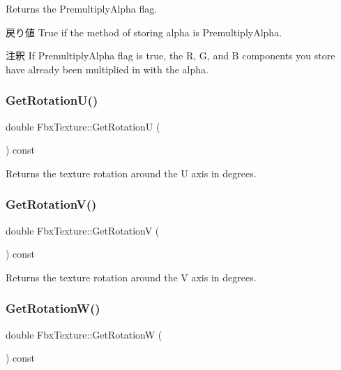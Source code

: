 Returns the Premultiply\+Alpha flag. \begin{DoxyReturn}{戻り値}
{\ttfamily True} if the method of storing alpha is Premultiply\+Alpha. 
\end{DoxyReturn}
\begin{DoxyRemark}{注釈}
If Premultiply\+Alpha flag is true, the R, G, and B components you store have already been multiplied in with the alpha. 
\end{DoxyRemark}
\mbox{\label{class_fbx_texture_a188819733b0abd2c91050393c036b982}} 
\subsubsection{\texorpdfstring{Get\+Rotation\+U()}{GetRotationU()}}
{\footnotesize\ttfamily double Fbx\+Texture\+::\+Get\+RotationU (\begin{DoxyParamCaption}{ }\end{DoxyParamCaption}) const}



Returns the texture rotation around the U axis in degrees. 

\mbox{\label{class_fbx_texture_a49b00097942d1664a04f39803d083406}} 
\subsubsection{\texorpdfstring{Get\+Rotation\+V()}{GetRotationV()}}
{\footnotesize\ttfamily double Fbx\+Texture\+::\+Get\+RotationV (\begin{DoxyParamCaption}{ }\end{DoxyParamCaption}) const}



Returns the texture rotation around the V axis in degrees. 

\mbox{\label{class_fbx_texture_a5f320c1d648dcf09323c7df39cfbb4c8}} 
\subsubsection{\texorpdfstring{Get\+Rotation\+W()}{GetRotationW()}}
{\footnotesize\ttfamily double Fbx\+Texture\+::\+Get\+RotationW (\begin{DoxyParamCaption}{ }\end{DoxyParamCaption}) const}



